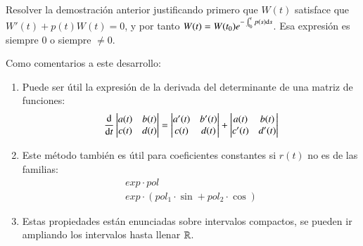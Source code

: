 \begin{th_ex}
    Resolver la demostración anterior justificando primero que $W(t)$ satisface que $W'(t) + p(t)W(t) = 0$, y por tanto $W(t) = W(t_0)e^{-\int_{t_0}^t p(s) \mathrm{d} s}$. Esa expresión es siempre $0$ o siempre $\neq 0$.
\end{th_ex}
Como comentarios a este desarrollo:
\begin{obs}
    \begin{enumerate}
    \item Puede ser útil la expresión de la derivada del determinante de una matriz de funciones:
    $$
        \frac{\mathrm{d}}{\mathrm{d}t}
        \left|
        \begin{matrix}
            a(t) & b(t) \\
            c(t) & d(t)
        \end{matrix}
        \right| =
        \left|
        \begin{matrix}
            a'(t) & b'(t) \\
            c(t) & d(t)
        \end{matrix}
        \right| +
        \left|
        \begin{matrix}
            a(t) & b(t) \\
            c'(t) & d'(t)
        \end{matrix}
        \right|
    $$
    \item Este método también es útil para coeficientes constantes si $r(t)$ no es de las familias:
    \begin{gather*}
        exp \cdot pol\\
        exp \cdot (pol_1\cdot\sin + pol_2\cdot\cos)
    \end{gather*}

    \item Estas propiedades están enunciadas sobre intervalos compactos, se pueden ir ampliando los intervalos hasta llenar $\mathbb{R}$.
    \end{enumerate}
\end{obs}
